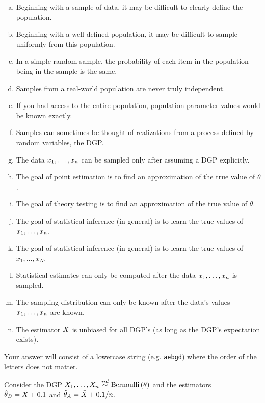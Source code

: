 \documentclass[12pt,landscape]{article}
\newcommand{\instr}{\small Your answer will consist of a lowercase string (e.g. \texttt{aebgd}) where the order of the letters does not matter. \normalsize}
\begin{document}
\begin{enumerate}[(a)]
\item Beginning with a sample of data, it may be difficult to clearly define the population.
\item Beginning with a well-defined population, it may be difficult to sample uniformly from this population.
\item In a simple random sample, the probability of each item in the population being in the sample is the same.
\item Samples from a real-world population are never truly independent.
\item If you had access to the entire population, population parameter values would be known exactly.
\item Samples can sometimes be thought of realizations from a process defined by random variables, the DGP.
\item The data $x_1, \ldots, x_n$ can be sampled only after assuming a DGP explicitly.
\item The goal of point estimation is to find an approximation of the true value of $\theta$.
\item The goal of theory testing is to find an approximation of the true value of $\theta$.
\item The goal of statistical inference (in general) is to learn the true values of $x_1, \ldots, x_n$.
\item The goal of statistical inference (in general) is to learn the true values of $x_1, \ldots, x_N$.
\item Statistical estimates can only be computed after the data $x_1, \ldots, x_n$ is sampled.
\item The sampling distribution can only be known after the data's values $x_1, \ldots, x_n$ are known.
\item The estimator $\bar{X}$ is unbiased for all DGP's (as long as the DGP's expectation exists).
\end{enumerate}
\eenum\instr\pagebreak


\problem{} Consider the DGP $\Xoneton \iid \bernoulli{\theta}$ and the estimators\\ $\hat{\theta}_B = \bar{X} + 0.1$ and $\hat{\theta}_A = \bar{X} + 0.1 / n$.

\vspace{-0.2cm}\benum{} 
\end{document}
